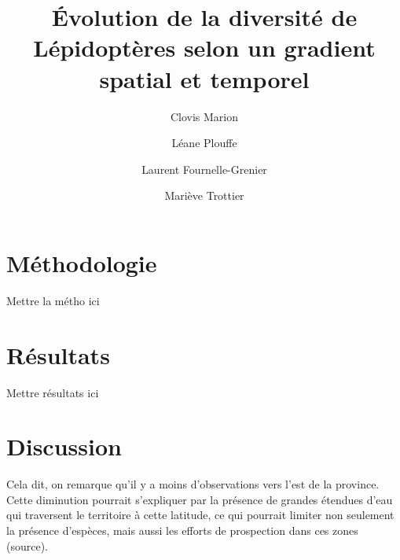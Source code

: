\documentclass[9pt,twocolumn,twoside,]{pnas-new}
\title{Évolution de la diversité de Lépidoptères selon un gradient
spatial et temporel}
\author[]{Clovis Marion}
\author[]{Léane Plouffe}
\author[]{Laurent Fournelle-Grenier}
\author[]{Mariève Trottier}
\begin{document}
\verticaladjustment{-2pt}



\maketitle
\thispagestyle{firststyle}


\acknow{}

\section*{Méthodologie}\label{muxe9thodologie}

Mettre la métho ici

\section*{Résultats}\label{ruxe9sultats}

Mettre résultats ici

\section*{Discussion}\label{discussion}

Cela dit, on remarque qu'il y a moins d'observations vers l'est de la
province. Cette diminution pourrait s'expliquer par la présence de
grandes étendues d'eau qui traversent le territoire à cette latitude, ce
qui pourrait limiter non seulement la présence d'espèces, mais aussi les
efforts de prospection dans ces zones (source).

\showmatmethods
\showacknow
\pnasbreak



% 
\end{document}
